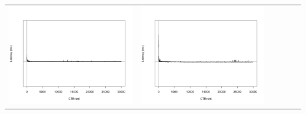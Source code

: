 \begin{table}[htbp]
{\begin{tabular}{l | ccccc}
\begin{minipage}{.15\textwidth}
				\vspace{2pt}
     			 	\includegraphics[width=\linewidth]{images/lat-log-graph/N4}
    				 \end{minipage}
    			   &	 \begin{minipage}{.15\textwidth}
     			 	
				\vspace{2pt}
     			 	\includegraphics[width=\linewidth]{images/lat-log-graph/N8}
    				 \end{minipage}
    			   &	 \begin{minipage}{.15\textwidth}
     			 	

\end{minipage}
\end{tabular}}
\end{table}
